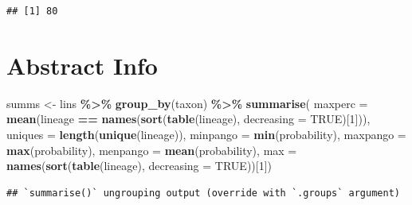 \documentclass[
]{article}
\newenvironment{Shaded}{\begin{snugshade}}{\end{snugshade}}
\newcommand{\CommentTok}[1]{\textcolor[rgb]{0.56,0.35,0.01}{\textit{#1}}}
\newcommand{\DataTypeTok}[1]{\textcolor[rgb]{0.13,0.29,0.53}{#1}}
\newcommand{\DecValTok}[1]{\textcolor[rgb]{0.00,0.00,0.81}{#1}}
\newcommand{\KeywordTok}[1]{\textcolor[rgb]{0.13,0.29,0.53}{\textbf{#1}}}
\newcommand{\NormalTok}[1]{#1}
\newcommand{\OperatorTok}[1]{\textcolor[rgb]{0.81,0.36,0.00}{\textbf{#1}}}
\newcommand{\OtherTok}[1]{\textcolor[rgb]{0.56,0.35,0.01}{#1}}
\newcommand{\StringTok}[1]{\textcolor[rgb]{0.31,0.60,0.02}{#1}}
\begin{document}
\begin{Shaded}
\end{Shaded}

\begin{verbatim}
## [1] 80
\end{verbatim}

\hypertarget{abstract-info}{%
\section{Abstract Info}\label{abstract-info}}

\begin{Shaded}
\begin{Highlighting}[]
\NormalTok{summs \textless{}{-}}\StringTok{ }\NormalTok{lins }\OperatorTok{\%\textgreater{}\%}
\StringTok{    }\KeywordTok{group\_by}\NormalTok{(taxon) }\OperatorTok{\%\textgreater{}\%}
\StringTok{    }\KeywordTok{summarise}\NormalTok{(}
        \DataTypeTok{maxperc =} \KeywordTok{mean}\NormalTok{(lineage }\OperatorTok{==}\StringTok{ }\KeywordTok{names}\NormalTok{(}\KeywordTok{sort}\NormalTok{(}\KeywordTok{table}\NormalTok{(lineage),}
            \DataTypeTok{decreasing =} \OtherTok{TRUE}\NormalTok{)[}\DecValTok{1}\NormalTok{])),}
        \DataTypeTok{uniques =} \KeywordTok{length}\NormalTok{(}\KeywordTok{unique}\NormalTok{(lineage)),}
        \DataTypeTok{minpango =} \KeywordTok{min}\NormalTok{(probability),}
        \DataTypeTok{maxpango =} \KeywordTok{max}\NormalTok{(probability),}
        \DataTypeTok{menpango =} \KeywordTok{mean}\NormalTok{(probability),}
        \DataTypeTok{max =} \KeywordTok{names}\NormalTok{(}\KeywordTok{sort}\NormalTok{(}\KeywordTok{table}\NormalTok{(lineage), }\DataTypeTok{decreasing =} \OtherTok{TRUE}\NormalTok{))[}\DecValTok{1}\NormalTok{])}
\end{Highlighting}
\end{Shaded}

\begin{verbatim}
## `summarise()` ungrouping output (override with `.groups` argument)
\end{verbatim}
\end{document}
